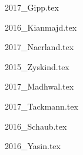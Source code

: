 {2017_Gipp.tex}

{2016_Kianmajd.tex}

{2017_Naerland.tex}

{2015_Zyskind.tex}

{2017_Madhwal.tex}

{2017_Tackmann.tex}

{2016_Schaub.tex}

{2016_Yasin.tex}

